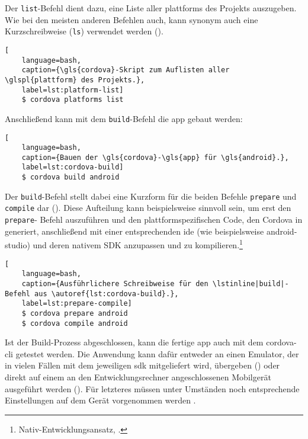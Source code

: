 {Der \lstinline|list|-Befehl dient dazu, eine Liste aller \glspl{plattform} des Projekts auszugeben. Wie bei den meisten anderen Befehlen auch, kann synonym auch eine Kurzschreibweise (\lstinline|ls|) verwendet werden ().

\par\noindent\begin{minipage}{\linewidth}
\begin{lstlisting}[
	language=bash,
	caption={\gls{cordova}-Skript zum Auflisten aller \glspl{plattform} des Projekts.},
	label=lst:platform-list]
	$ cordova platforms list
\end{lstlisting}
\end{minipage}\par\addvspace{\topskip}

\par\noindent\begin{minipage}{\linewidth}
Anschließend kann mit dem \lstinline|build|-Befehl die \gls{app} gebaut werden:
\begin{lstlisting}[
	language=bash,
	caption={Bauen der \gls{cordova}-\gls{app} für \gls{android}.},
	label=lst:cordova-build]
	$ cordova build android
\end{lstlisting}
\end{minipage}\par\addvspace{\topskip}

Der \lstinline|build|-Befehl stellt dabei eine Kurzform für die beiden Befehle \lstinline|prepare| und  \lstinline|compile| dar ().
Diese Aufteilung kann beispielsweise sinnvoll sein, um erst den \lstinline|prepare|- Befehl auszuführen und den plattformspezifischen Code, den Cordova in  generiert, anschließend mit einer entsprechenden \gls{ide} (wie beispielsweise \gls{android-studio}) und deren nativem SDK anzupassen und zu kompilieren.\footnote{\vgl Nativ-Entwicklungsansatz, \so.}

\begin{lstlisting}[
	language=bash,
	caption={Ausführlichere Schreibweise für den \lstinline|build|-Befehl aus \autoref{lst:cordova-build}.},
	label=lst:prepare-compile]
	$ cordova prepare android
	$ cordova compile android
\end{lstlisting}

Ist der Build-Prozess abgeschlossen, kann die fertige \gls{app} auch mit dem \gls{cordova}-\gls{cli} getestet werden. 
Die Anwendung kann dafür entweder an einen Emulator, der in vielen Fällen mit dem jeweiligen \gls{sdk} mitgeliefert wird, übergeben () oder direkt auf einem an den Entwicklungsrechner angeschlossenen Mobilgerät ausgeführt werden ().
Für letzteres müssen unter Umständen noch entsprechende Einstellungen auf dem Gerät vorgenommen werden \cite{Cordova-Docs_CLI}.

}
